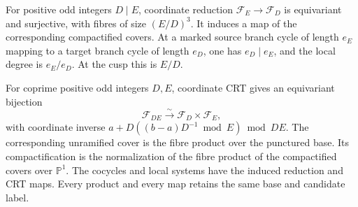 \begin{proposition}
\label{prop:crt}
For positive odd integers $D\mid E$, coordinate reduction
$\mathcal F_E\to\mathcal F_D$ is equivariant and surjective, with fibres
of size $(E/D)^3$. It induces a map of the corresponding compactified
covers. At a marked source branch cycle of length $e_E$ mapping to a
target branch cycle of length $e_D$, one has $e_D\mid e_E$, and the local
degree is $e_E/e_D$. At the cusp this is $E/D$.

For coprime positive odd integers $D,E$, coordinate CRT gives an
equivariant bijection
\[
 \mathcal F_{DE}\xrightarrow{\sim}\mathcal F_D\times\mathcal F_E,
\]
with coordinate inverse
$a+D((b-a)D^{-1}\bmod E)\bmod DE$.
The corresponding unramified cover is the fibre product over the
punctured base. Its compactification is the normalization of the fibre
product of the compactified covers over $\mathbb P^1$.
The cocycles and local systems have the induced reduction and CRT maps.
Every product and every map retains the same base and candidate label.
\end{proposition}
